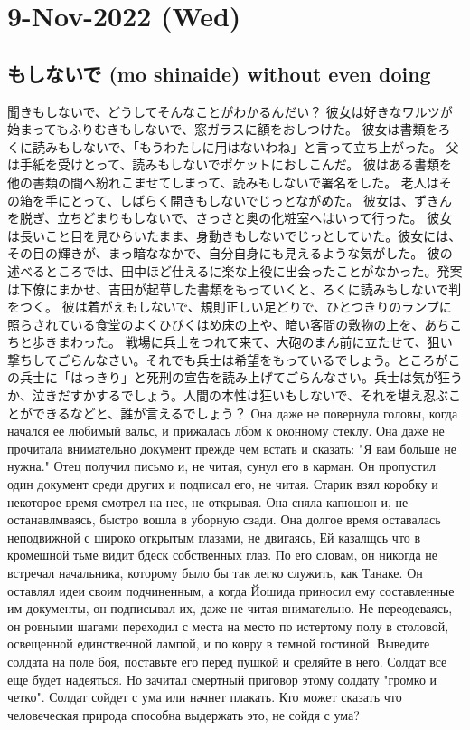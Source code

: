 \section{9-Nov-2022 (Wed)}
\subsection{もしないで (mo shinaide) without even doing}

聞きもしないで、どうしてそんなことがわかるんだい？
彼女は好きなワルツが始まってもふりむきもしないで、窓ガラスに額をおしつけた。
彼女は書類をろくに読みもしないで、「もうわたしに用はないわね」と言って立ち上がった。
父は手紙を受けとって、読みもしないでポケットにおしこんだ。
彼はある書類を他の書類の間へ紛れこませてしまって、読みもしないで署名をした。
老人はその箱を手にとって、しばらく開きもしないでじっとながめた。
彼女は、ずきんを脱ぎ、立ちどまりもしないで、さっさと奥の化粧室へはいって行った。
彼女は長いこと目を見ひらいたまま、身動きもしないでじっとしていた。彼女には、その目の輝きが、まっ暗ななかで、自分自身にも見えるような気がした。
彼の述べるところでは、田中ほど仕えるに楽な上役に出会ったことがなかった。発案は下僚にまかせ、吉田が起草した書類をもっていくと、ろくに読みもしないで判をつく。
彼は着がえもしないで、規則正しい足どりで、ひとつきりのランプに照らされている食堂のよくひびくはめ床の上や、暗い客間の敷物の上を、あちこちと歩きまわった。
戦場に兵士をつれて来て、大砲のまん前に立たせて、狙い撃ちしてごらんなさい。それでも兵士は希望をもっているでしょう。ところがこの兵士に「はっきり」と死刑の宣告を読み上げてごらんなさい。兵士は気が狂うか、泣きだすかするでしょう。人間の本性は狂いもしないで、それを堪え忍ぶことができるなどと、誰が言えるでしょう？
Она даже не повернула головы, когда начался ее любимый вальс, и прижалась лбом к оконному стеклу.
Она даже не прочитала внимательно документ прежде чем встать и сказать: "Я вам больше не нужна."
Отец получил письмо и, не читая, сунул его в карман.
Он пропустил один документ среди других и подписал его, не читая.
Старик взял коробку и некоторое время смотрел на нее, не открывая.
Она сняла капюшон и, не останавлмваясь, быстро вошла в уборную сзади.
Она долгое время оставалась неподвижной с широко открытым глазами, не двигаясь, Ей казалщсь что в кромешной тьме видит бдеск собственных глаз.
По его словам, он никогда не встречал начальника, которому было бы так легко служить, как Танаке. Он оставлял идеи своим подчиненным, а когда Йошида приносил ему составленные им документы, он подписывал их, даже не читая внимательно.
Не переодеваясь, он ровными шагами переходил с места на место по истертому полу в столовой, освещенной единственной лампой, и по ковру в темной гостиной.
Выведите солдата на поле боя, поставьте его перед пушкой и среляйте в него.  Солдат все еще будет надеяться. Но зачитал смертный приговор этому солдату "громко и четко". Солдат сойдет с ума или начнет плакать. Кто может сказать что человеческая природа способна выдержать это, не сойдя с ума?

